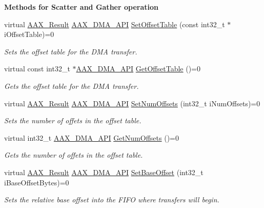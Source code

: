 \begin{Indent}{\bf Methods for Scatter and Gather operation}
\begin{DoxyCompactItemize}
virtual \hyperlink{a00149_a4d8f69a697df7f70c3a8e9b8ee130d2f}{A\+A\+X\+\_\+\+Result} \hyperlink{a00243_acae60d01e5e4bd3282369d0d9d378f3f}{A\+A\+X\+\_\+\+D\+M\+A\+\_\+\+A\+P\+I} \hyperlink{a00095_a9a106088088a8fc812b137bd90c0fa3a}{Set\+Offset\+Table} (const int32\+\_\+t $\ast$i\+Offset\+Table)=0
\begin{DoxyCompactList}\small\item\em Sets the offset table for the D\+M\+A transfer. \end{DoxyCompactList}\item 
virtual const int32\+\_\+t $\ast$\hyperlink{a00243_acae60d01e5e4bd3282369d0d9d378f3f}{A\+A\+X\+\_\+\+D\+M\+A\+\_\+\+A\+P\+I} \hyperlink{a00095_ab00bbebfffe925b8332eade3457d706e}{Get\+Offset\+Table} ()=0
\begin{DoxyCompactList}\small\item\em Gets the offset table for the D\+M\+A transfer. \end{DoxyCompactList}\item 
virtual \hyperlink{a00149_a4d8f69a697df7f70c3a8e9b8ee130d2f}{A\+A\+X\+\_\+\+Result} \hyperlink{a00243_acae60d01e5e4bd3282369d0d9d378f3f}{A\+A\+X\+\_\+\+D\+M\+A\+\_\+\+A\+P\+I} \hyperlink{a00095_a58f2933fda57ac6a1cdf20cce96aceac}{Set\+Num\+Offsets} (int32\+\_\+t i\+Num\+Offsets)=0
\begin{DoxyCompactList}\small\item\em Sets the number of offets in the offset table. \end{DoxyCompactList}\item 
virtual int32\+\_\+t \hyperlink{a00243_acae60d01e5e4bd3282369d0d9d378f3f}{A\+A\+X\+\_\+\+D\+M\+A\+\_\+\+A\+P\+I} \hyperlink{a00095_a582df429c4f543d66d63c87e2ea3a1e2}{Get\+Num\+Offsets} ()=0
\begin{DoxyCompactList}\small\item\em Gets the number of offets in the offset table. \end{DoxyCompactList}\item 
virtual \hyperlink{a00149_a4d8f69a697df7f70c3a8e9b8ee130d2f}{A\+A\+X\+\_\+\+Result} \hyperlink{a00243_acae60d01e5e4bd3282369d0d9d378f3f}{A\+A\+X\+\_\+\+D\+M\+A\+\_\+\+A\+P\+I} \hyperlink{a00095_ac3a22df0462c7f4888a429b3eadae4dd}{Set\+Base\+Offset} (int32\+\_\+t i\+Base\+Offset\+Bytes)=0
\begin{DoxyCompactList}\small\item\em Sets the relative base offset into the F\+I\+F\+O where transfers will begin. \end{DoxyCompactList}\item 

\end{DoxyCompactItemize}
\end{Indent}
